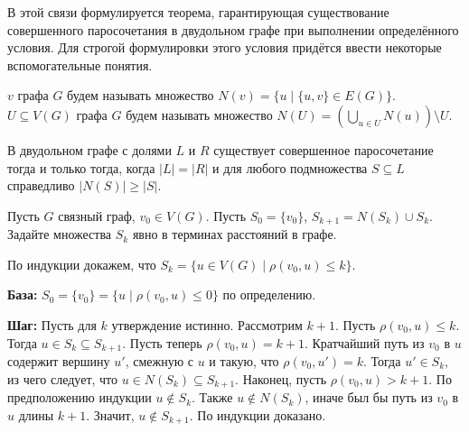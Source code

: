 В этой связи формулируется теорема, гарантирующая существование совершенного паросочетания в двудольном графе при выполнении определённого условия.
Для строгой формулировки этого условия придётся ввести некоторые вспомогательные понятия.

\begin{definition}
     $ v $ графа $ G $ будем называть множество $ N(v) = \{ u \mid \{u, v\} \in E(G) \} $.
     $ U \subseteq V(G) $ графа $ G $ будем называть множество $ N(U) = \left( \bigcup_{u \in U} N(u) \right) \setminus U $.
\end{definition}

\begin{theorem}
    В двудольном графе с долями $ L $ и $ R $ существует совершенное паросочетание тогда и только тогда,
    когда $ |L| = |R| $ и для любого подмножества $ S \subseteq L $ справедливо $ |N(S)| \geqslant |S| $.
\end{theorem}

\begin{Exercise}[counter=SecExercise, label={exercise:almost_BFS}]
    \noindent
    Пусть $ G $ связный граф, $ v_0 \in V(G) $.
    Пусть $ S_0 = \{ v_0 \} $, $ S_{k+1} = N(S_k) \cup S_k $.
    Задайте множества $ S_k $ явно в терминах расстояний в графе.
\end{Exercise}

\begin{Answer}
    \noindent
    По индукции докажем, что $ S_k = \{ u \in V(G) \mid \rho(v_0, u) \leqslant k \} $.

    \textbf{База:}
    $ S_0 = \{ v_0 \} = \{ u \mid \rho(v_0, u) \leqslant 0 \} $ по определению.

    \textbf{Шаг:}
    Пусть для $ k $ утверждение истинно.
    Рассмотрим $ k + 1 $.
    Пусть $ \rho(v_0, u) \leqslant k $.
    Тогда $ u \in S_k \subseteq S_{k+1} $.
    Пусть теперь $ \rho(v_0, u) = k + 1 $.
    Кратчайший путь из $ v_0 $ в $ u $ содержит вершину $ u' $, смежную с $ u $ и такую, что $ \rho(v_0, u') = k $.
    Тогда $ u' \in S_k $, из чего следует, что $ u \in N(S_k) \subseteq S_{k+1} $.
    Наконец, пусть $ \rho(v_0, u) > k + 1 $.
    По предположению индукции $ u \notin S_k $.
    Также $ u \notin N(S_k) $, иначе был бы путь из $ v_0 $ в $ u $ длины $ k + 1 $.
    Значит, $ u \notin S_{k+1} $.
    \newline
    По индукции доказано.

\end{Answer}

